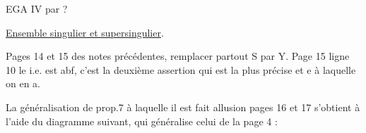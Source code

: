 \margin{\unsure{//}}  

\margin{\unsure{(}}EGA IV par ?

\uline{Ensemble singulier et supersingulier}.

Pages 14 et 15 des notes précédentes, remplacer partout S par Y. Page
15 ligne 10 le i.e. est abf, c'est la deuxième assertion qui est la
plus précise et e à laquelle on en a.

La généralisation de prop.7 à laquelle il est fait allusion pages 16
et 17 s'obtient à l'aide du diagramme suivant, qui généralise celui de la
page 4 :

